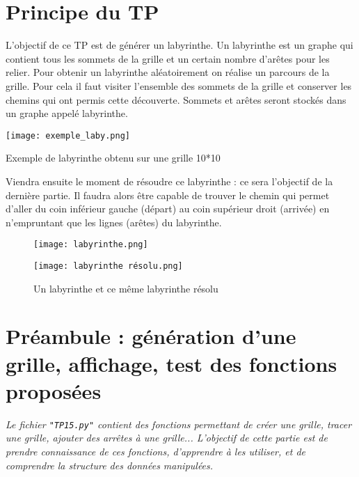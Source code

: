 \section*{Principe du TP}
L'objectif de ce TP est de générer un labyrinthe. Un labyrinthe est un graphe qui contient tous les sommets de la grille et un certain nombre d'arêtes pour les relier.
Pour obtenir un labyrinthe aléatoirement on réalise un parcours de la grille.
Pour cela il faut visiter l'ensemble des sommets de la grille et conserver les chemins qui ont permis cette découverte. Sommets et arêtes seront stockés dans un graphe appelé labyrinthe.

\begin{marginfigure}
\texttt{[image: exemple\_laby.png]}
\caption{Exemple de labyrinthe obtenu sur une grille 10*10}
\end{marginfigure}


Viendra ensuite le moment de résoudre ce labyrinthe : ce sera l'objectif de la dernière partie. Il faudra alors être capable de trouver le chemin qui permet d'aller du coin inférieur gauche (départ) au coin supérieur droit (arrivée) en n'empruntant que les lignes (arêtes) du labyrinthe. 

	
\begin{figure}[!h]\centering
	\begin{minipage}{.4\textwidth}
	\texttt{[image: labyrinthe.png]}
	\end{minipage}
\hspace{0.5 cm}	
	\begin{minipage}{.4\textwidth}
	
		\texttt{[image: labyrinthe résolu.png]}
		
	\end{minipage}
\caption{Un labyrinthe et ce même labyrinthe résolu}
\end{figure}


\section*{Préambule : génération d'une grille, affichage, test des fonctions proposées}

\textit{Le fichier \texttt{"TP15.py"}  contient des fonctions permettant de créer une grille, tracer une grille, ajouter des arrêtes à une grille... L'objectif de cette partie est de prendre connaissance de ces fonctions, d'apprendre à les utiliser, et de comprendre la structure des données manipulées.}\\


